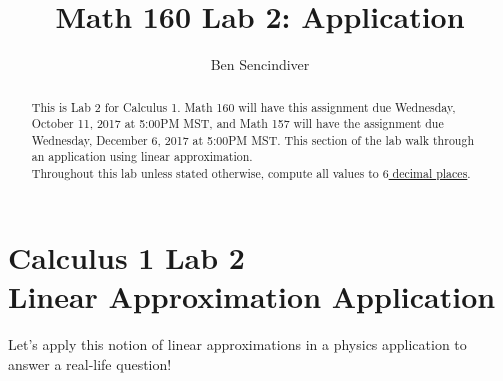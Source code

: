 \documentclass[handout,nooutcomes]{ximera}
\title{Math 160 Lab 2: Application}
\author{Ben Sencindiver} %
\begin{document}
\section{Calculus 1 Lab 2 \\ Linear Approximation Application}

\begin{abstract}
This is Lab 2 for Calculus 1. Math 160 will have this assignment due Wednesday, October 11, 2017 at 5:00PM MST, and Math 157 will have the assignment due Wednesday, December 6, 2017  at 5:00PM MST.
This section of the lab walk through an application using linear approximation.\\

Throughout this lab unless stated otherwise, compute all values to \underline{$6$ decimal places}.
\end{abstract}

\maketitle



Let's apply this notion of linear approximations in a physics application to
answer a real-life question!\\
\end{document}

